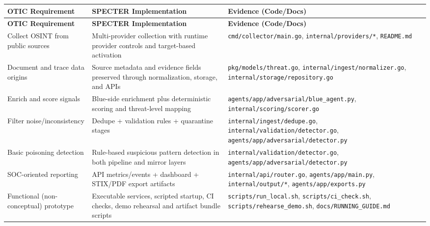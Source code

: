 \documentclass[11pt,a4paper]{article}
\begin{document}
\begin{longtable}{>{\raggedright\arraybackslash}p{} >{\raggedright\arraybackslash}p{} >{\raggedright\arraybackslash}p{}}
\toprule
\textbf{OTIC Requirement} & \textbf{SPECTER Implementation} & \textbf{Evidence (Code/Docs)} \\
\midrule
\endfirsthead
\toprule
\textbf{OTIC Requirement} & \textbf{SPECTER Implementation} & \textbf{Evidence (Code/Docs)} \\
\midrule
\endhead

Collect OSINT from public sources & Multi-provider collection with runtime provider controls and target-based activation & \texttt{cmd/collector/main.go}, \texttt{internal/providers/*}, \texttt{README.md} \\

Document and trace data origins & Source metadata and evidence fields preserved through normalization, storage, and APIs & \texttt{pkg/models/threat.go}, \texttt{internal/ingest/normalizer.go}, \texttt{internal/storage/repository.go} \\

Enrich and score signals & Blue-side enrichment plus deterministic scoring and threat-level mapping & \texttt{agents/app/adversarial/blue\_agent.py}, \texttt{internal/scoring/scorer.go} \\

Filter noise/inconsistency & Dedupe + validation rules + quarantine stages & \texttt{internal/ingest/dedupe.go}, \texttt{internal/validation/detector.go}, \texttt{agents/app/adversarial/detector.py} \\

Basic poisoning detection & Rule-based suspicious pattern detection in both pipeline and mirror layers & \texttt{internal/validation/detector.go}, \texttt{agents/app/adversarial/detector.py} \\

SOC-oriented reporting & API metrics/events + dashboard + STIX/PDF export artifacts & \texttt{internal/api/router.go}, \texttt{agents/app/main.py}, \texttt{internal/output/*}, \texttt{agents/app/exports.py} \\

Functional (non-conceptual) prototype & Executable services, scripted startup, CI checks, demo rehearsal and artifact bundle scripts & \texttt{scripts/run\_local.sh}, \texttt{scripts/ci\_check.sh}, \texttt{scripts/rehearse\_demo.sh}, \texttt{docs/RUNNING\_GUIDE.md} \\

\bottomrule
\end{longtable}
\end{document}
